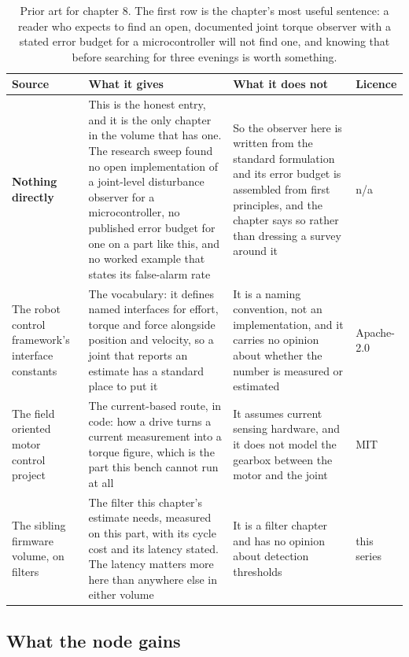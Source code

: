 \begin{table}[H]\centering\small
\begin{tabular}{p{34mm}p{46mm}p{38mm}p{20mm}}
\toprule
Source & What it gives & What it does not & Licence \\
\midrule
\textbf{Nothing directly} & This is the honest entry, and it is the only chapter in the volume that has one. The research sweep found no open implementation of a joint-level disturbance observer for a microcontroller, no published error budget for one on a part like this, and no worked example that states its false-alarm rate & So the observer here is written from the standard formulation and its error budget is assembled from first principles, and the chapter says so rather than dressing a survey around it & n/a \\
The robot control framework's interface constants & The vocabulary: it defines named interfaces for effort, torque and force alongside position and velocity, so a joint that reports an estimate has a standard place to put it & It is a naming convention, not an implementation, and it carries no opinion about whether the number is measured or estimated & Apache-2.0 \\
The field oriented motor control project & The current-based route, in code: how a drive turns a current measurement into a torque figure, which is the part this bench cannot run at all & It assumes current sensing hardware, and it does not model the gearbox between the motor and the joint & MIT \\
The sibling firmware volume, on filters & The filter this chapter's estimate needs, measured on this part, with its cycle cost and its latency stated. The latency matters more here than anywhere else in either volume & It is a filter chapter and has no opinion about detection thresholds & this series \\
\bottomrule
\end{tabular}
\caption{Prior art for chapter 8. The first row is the chapter's most useful sentence: a reader who expects to find an open, documented joint torque observer with a stated error budget for a microcontroller will not find one, and knowing that before searching for three evenings is worth something.}
\end{table}

\subsection*{What the node gains}

